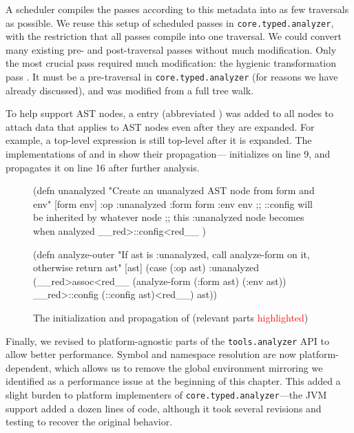 A scheduler compiles the passes according to this metadata into as few traversals as possible.
We reuse this setup of scheduled passes in \texttt{core.typed.analyzer},
with the restriction that all passes compile into one traversal.
We could convert many existing pre- and post-traversal passes without much modification.
Only the most crucial pass required much modification:
the hygienic transformation pass .
It must be a pre-traversal in \texttt{core.typed.analyzer} (for reasons we have already discussed),
and was modified from a full tree walk.


To help support  AST nodes, a 
entry (abbreviated ) was added to all nodes
to attach data that applies to AST nodes even after they are expanded.
For example, a top-level expression is still top-level after it is expanded.
The implementations of  and 
in  show their propagation---
initializes  on line 9, and  propagates it on line 16 after further analysis.

\begin{figure}
\lstset{numbers=left,xleftmargin=2em,framexleftmargin=1.5em}
  \begin{cljlisting}
(defn unanalyzed
  "Create an unanalyzed AST node from form and env"
  [form env]
  {:op :unanalyzed
   :form form
   :env env
   ;; ::config will be inherited by whatever node
   ;; this :unanalyzed node becomes when analyzed
   __red>::config<red__ {}})

(defn analyze-outer
  "If ast is :unanalyzed, call analyze-form on it, otherwise return ast"
  [ast]
  (case (:op ast)
    :unanalyzed (__red>assoc<red__ (analyze-form (:form ast) (:env ast))
                       __red>::config (::config ast)<red__)
    ast))
\end{cljlisting}
  \caption{The initialization and propagation of  (relevant parts \textcolor{red}{highlighted})}
  \label{fig:analyzer:config-inheritance}
\end{figure}

Finally, we revised to platform-agnostic parts of the \texttt{tools.analyzer} API
to allow better performance.
Symbol and namespace resolution are now platform-dependent, which allows us to 
remove the global environment mirroring we identified as a performance issue
at the beginning of this chapter.
This added a slight burden to platform implementers of 
\texttt{core.typed.analyzer}---the JVM support added a dozen lines of code, although
it took several revisions and testing to recover the original behavior.

